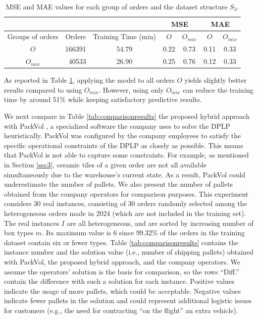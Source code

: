 \documentclass[runningheads]{llncs}
\newcommand{\rev}[1]{{#1}}
\begin{document}
\begin{table}[H]
\centering
\caption{MSE and MAE values for each group of orders and the dataset structure $S_3$.}
\label{tab:finalresultstable}
\begin{tabular}{ccc|cc|cc|}
\cline{4-7}
\multicolumn{1}{c}{}            &                       &  & \multicolumn{2}{c|}{MSE}         & \multicolumn{2}{c|}{MAE}         \\ \hline \hline
\multicolumn{1}{|c|}{Groups of orders} &
  \multicolumn{1}{c|}{Orders} &
  Training Time (min) &
  \multicolumn{1}{c|}{$O$} &
  $O_{mix}$ &
  \multicolumn{1}{c|}{$O$} &
  $O_{mix}$ \\ \hline
\multicolumn{1}{|c|}{$O$} & \multicolumn{1}{r|}{166391} & \multicolumn{1}{c|}{54.79} & \multicolumn{1}{c|}{0.22} & 0.73 & \multicolumn{1}{c|}{0.11} & 0.33 \\ \hline
\multicolumn{1}{|c|}{$O_{mix}$} & \multicolumn{1}{r|}{40533} & \multicolumn{1}{c|}{ 26.90}  & \multicolumn{1}{c|}{0.25} & 0.76 & \multicolumn{1}{c|}{0.12} & 0.33 \\ \hline
\end{tabular}
\end{table}

As reported in Table \ref{tab:finalresultstable}, applying the model to all orders $O$ yields slightly better results compared to using $O_{mix}$. However, using only $O_{mix}$ can reduce the training time by around 51\% while keeping satisfactory predictive results. 

We next compare in Table \ref{tab:comparisonresults} the proposed hybrid approach with PackVol \cite{packvol}, a specialized software the company uses to solve the DPLP heuristically. PackVol was configured by the company employees to satisfy the specific operational constraints of the DPLP as closely as possible. This means that PackVol is not able to capture some constraints. For example, as mentioned in Section \ref{sec3}, ceramic tiles of a given order are not all available simultaneously due to the warehouse's current state. As a result, PackVol could underestimate the number of pallets. We also present the number of pallets obtained from the company operators for comparison purposes. This experiment considers 30 real instances, consisting of 30 orders randomly selected among the heterogeneous orders made in 2024 (which are not included in the training set). 
The real instances $I$ are all heterogeneous, and are sorted by increasing number of box types $m$. Its maximum value is 6 since 99.32\% of the orders in the training dataset contain six or fewer types. Table \ref{tab:comparisonresults} contains the instance number and the solution value (i.e., number of shipping pallets) obtained with PackVol, the proposed hybrid approach, and the company operators. We assume the operators' solution is the basis for comparison, so the rows ``Diff.'' contain the difference with such a solution for each instance. \rev{Positive values indicate the usage of more pallets, which could be acceptable. Negative values indicate fewer pallets in the solution and could represent additional logistic issues for customers (e.g., the need for contracting ``on the flight'' an extra vehicle).}
\end{document}
